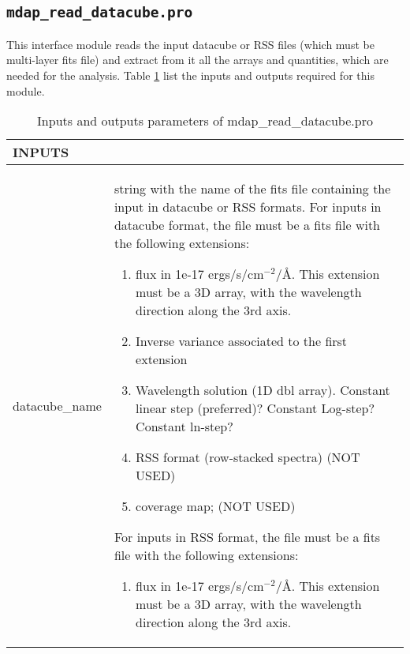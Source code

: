 \subsection{{\tt mdap\_read\_datacube.pro}}
\label{dap_sec:mdap_read_datacube}

This interface module reads the input datacube or RSS files (which
must be multi-layer fits file) and extract from it all the arrays and
quantities, which are needed for the analysis. Table
\ref{dap_tab:mdap_read_datacube} list the inputs and outputs required
for this module.



\begin{center}
\begin{longtable}{p{2.7cm}| p{11.1cm}}
\caption{Inputs and outputs parameters of mdap\_read\_datacube.pro} \label{dap_tab:mdap_read_datacube} \\
\hline
{\bf  INPUTS} & \\
\hline
\endfirsthead
\hline
\endhead
\hline
\endlastfoot
\hline
datacube\_name & string with the name of the fits file containing the input in datacube or RSS formats. 
                         For inputs in datacube format, the file must be a fits file with the following
                         extensions:
                                \begin{enumerate}
                             \item flux in 1e-17 ergs/s/cm$^{-2}$/\AA. This extension must be a 3D
                               array, with the wavelength direction along the 3rd axis. 
                            \item  Inverse variance associated to the first extension
                            \item  Wavelength solution (1D dbl array). Constant linear step
                              (preferred)? Constant Log-step? Constant ln-step?
                            \item  RSS format (row-stacked spectra) (NOT USED)                  
                            \item  coverage map; (NOT USED)
                           \end{enumerate}

                         For inputs in RSS format, the file must be a fits file with the following
                         extensions:
                          \begin{enumerate}
                            \item flux in 1e-17 ergs/s/cm$^{-2}$/\AA. This extension must be a 3D
                               array, with the wavelength direction along the 3rd axis.
 

\end{enumerate}
\end{longtable}
\end{center}
